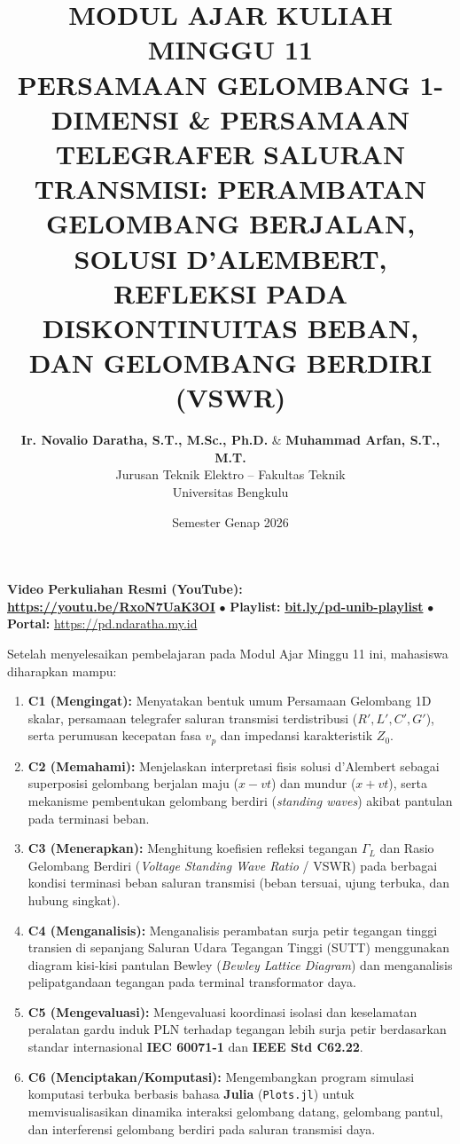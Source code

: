 \documentclass[11pt,a4paper]{article}
\title{\textbf{\Large MODUL AJAR KULIAH MINGGU 11}\\[0.3cm]
\textbf{\LARGE PERSAMAAN GELOMBANG 1-DIMENSI \& PERSAMAAN TELEGRAFER SALURAN TRANSMISI: PERAMBATAN GELOMBANG BERJALAN, SOLUSI D'ALEMBERT, REFLEKSI PADA DISKONTINUITAS BEBAN, DAN GELOMBANG BERDIRI (VSWR)}}
\author{\textbf{Ir. Novalio Daratha, S.T., M.Sc., Ph.D.} \& \textbf{Muhammad Arfan, S.T., M.T.} \\ 
Jurusan Teknik Elektro -- Fakultas Teknik \\ 
Universitas Bengkulu}
\date{Semester Genap 2026}
\theoremstyle{definition}
\begin{document}
\maketitle
\begin{center}
  \vspace{-0.25cm}
  \begin{tcolorbox}[colback=red!4!white,colframe=red!75!black,boxrule=0.5pt,arc=2pt,left=6pt,right=6pt,top=3pt,bottom=3pt,width=0.98\textwidth]
    \centering\footnotesize
    \textbf{Video Perkuliahan Resmi (YouTube):} {\color{red!80!black}\textbf{\url{https://youtu.be/RxoN7UaK3OI}}} \quad $\bullet$ \quad \textbf{Playlist:} \href{https://www.youtube.com/playlist?list=PLS5oOZWXZeTw}{\color{blue!80!black}\textbf{bit.ly/pd-unib-playlist}} \quad $\bullet$ \quad \textbf{Portal:} \url{https://pd.ndaratha.my.id}
  \end{tcolorbox}
  \vspace{-0.15cm}
\end{center}


\begin{tcolorbox}[colback=blue!5!white,colframe=headercolor,title=\textbf{Capaian Pembelajaran Khusus (Sub-CPMK 6)}]
Setelah menyelesaikan pembelajaran pada Modul Ajar Minggu 11 ini, mahasiswa diharapkan mampu:
\begin{enumerate}[leftmargin=*]
    \item \textbf{C1 (Mengingat):} Menyatakan bentuk umum Persamaan Gelombang 1D skalar, persamaan telegrafer saluran transmisi terdistribusi ($R', L', C', G'$), serta perumusan kecepatan fasa $v_p$ dan impedansi karakteristik $Z_0$.
    \item \textbf{C2 (Memahami):} Menjelaskan interpretasi fisis solusi d'Alembert sebagai superposisi gelombang berjalan maju ($x - vt$) dan mundur ($x + vt$), serta mekanisme pembentukan gelombang berdiri (\textit{standing waves}) akibat pantulan pada terminasi beban.
    \item \textbf{C3 (Menerapkan):} Menghitung koefisien refleksi tegangan $\Gamma_L$ dan Rasio Gelombang Berdiri (\textit{Voltage Standing Wave Ratio} / VSWR) pada berbagai kondisi terminasi beban saluran transmisi (beban tersuai, ujung terbuka, dan hubung singkat).
    \item \textbf{C4 (Menganalisis):} Menganalisis perambatan surja petir tegangan tinggi transien di sepanjang Saluran Udara Tegangan Tinggi (SUTT) menggunakan diagram kisi-kisi pantulan Bewley (\textit{Bewley Lattice Diagram}) dan menganalisis pelipatgandaan tegangan pada terminal transformator daya.
    \item \textbf{C5 (Mengevaluasi):} Mengevaluasi koordinasi isolasi dan keselamatan peralatan gardu induk PLN terhadap tegangan lebih surja petir berdasarkan standar internasional \textbf{IEC 60071-1} dan \textbf{IEEE Std C62.22}.
    \item \textbf{C6 (Menciptakan/Komputasi):} Mengembangkan program simulasi komputasi terbuka berbasis bahasa \textbf{Julia} (\texttt{Plots.jl}) untuk memvisualisasikan dinamika interaksi gelombang datang, gelombang pantul, dan interferensi gelombang berdiri pada saluran transmisi daya.
\end{enumerate}
\end{tcolorbox}
\end{document}
